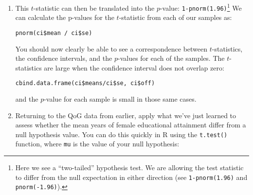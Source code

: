 \documentclass[a4paper,12pt]{article}
\begin{document}
\begin{enumerate}
\begin{verbatim}
ci$mean / ci$se
\end{verbatim}

\noindent When this test statistic exceeds the critical value, $\alpha$, then the statistic is deemed statistically significantly different from the null hypothesis value. The critical value is simply based on a hypothetical distribution, in this case the $t$-distribution (which, in large samples, is identical to the normal or Gaussian distribution noted earlier). When we earlier selected a value of $\alpha$ we were in essence setting the critical value of our $t$-statistic. Recall for our 95\% confidence interval, we selected an $\alpha$ value of \texttt{qnorm(0.025)} (approximately 1.96). Thus, when our sample $t$-statistic exceeds this value, then we have a statistically significant result because our test statistic is very far from the null hypothesis value of 0. Our null hypothesis implies a distribution of test statistics that follows the $t$ distribution and, given that expected distribution of possible test statistics, a sample test statistic larger than 1.96\% would be quite rare (less than 5\% of test statistics observed for samples from a population of mean 0 would have test statistics that large or larger).

\item This $t$-statistic can then be translated into the $p$-value: \texttt{1-pnorm(1.96)}\footnote{Here we see a ``two-tailed'' hypothesis test. We are allowing the test statistic to differ from the null expectation in either direction (see \texttt{1-pnorm(1.96)} and \texttt{pnorm(-1.96)}).} We can calculate the p-values for the $t$-statistic from each of our samples as:

\begin{verbatim}
pnorm(ci$mean / ci$se)
\end{verbatim}

\noindent You should now clearly be able to see a correspondence between $t$-statistics, the confidence intervals, and the $p$-values for each of the samples. The $t$-statistics are large when the confidence interval does not overlap zero:

\begin{verbatim}
cbind.data.frame(ci$means/ci$se, ci$off)
\end{verbatim}

\noindent and the $p$-value for each sample is small in those same cases.


\item Returning to the QoG data from earlier, apply what we've just learned to assess whether the mean years of female educational attainment differ from a null hypothesis value. You can do this quickly in R using the \texttt{t.test()} function, where \texttt{mu} is the value of your null hypothesis:


\end{enumerate}
\end{document}
